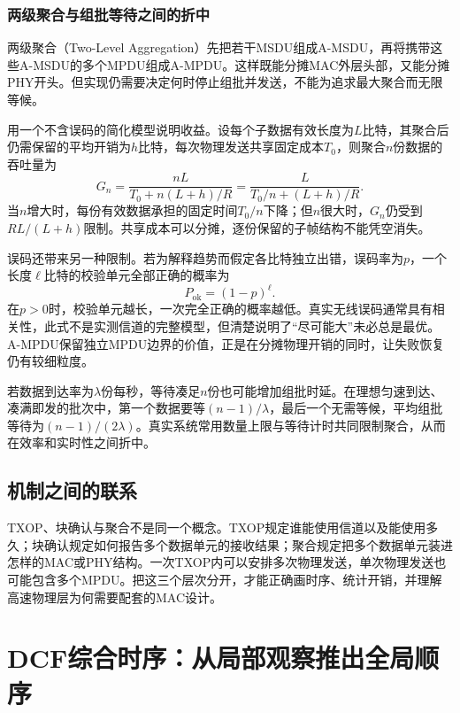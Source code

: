 \subsubsection{两级聚合与组批等待之间的折中}

两级聚合（Two-Level Aggregation）先把若干MSDU组成A-MSDU，再将携带这些A-MSDU的多个MPDU组成A-MPDU。这样既能分摊MAC外层头部，又能分摊PHY开头。但实现仍需要决定何时停止组批并发送，不能为追求最大聚合而无限等候。

用一个不含误码的简化模型说明收益。设每个子数据有效长度为$L$比特，其聚合后仍需保留的平均开销为$h$比特，每次物理发送共享固定成本$T_0$，则聚合$n$份数据的吞吐量为
\begin{equation}
G_n=\frac{nL}{T_0+n(L+h)/R}
=\frac{L}{T_0/n+(L+h)/R}.
\end{equation}
当$n$增大时，每份有效数据承担的固定时间$T_0/n$下降；但$n$很大时，$G_n$仍受到$R L/(L+h)$限制。共享成本可以分摊，逐份保留的子帧结构不能凭空消失。

误码还带来另一种限制。若为解释趋势而假定各比特独立出错，误码率为$p$，一个长度$\ell$比特的校验单元全部正确的概率为
\begin{equation}
P_{\mathrm{ok}}=(1-p)^\ell.
\end{equation}
在$p>0$时，校验单元越长，一次完全正确的概率越低。真实无线误码通常具有相关性，此式不是实测信道的完整模型，但清楚说明了“尽可能大”未必总是最优。A-MPDU保留独立MPDU边界的价值，正是在分摊物理开销的同时，让失败恢复仍有较细粒度。

若数据到达率为$\lambda$份每秒，等待凑足$n$份也可能增加组批时延。在理想匀速到达、凑满即发的批次中，第一个数据要等$(n-1)/\lambda$，最后一个无需等候，平均组批等待为$(n-1)/(2\lambda)$。真实系统常用数量上限与等待计时共同限制聚合，从而在效率和实时性之间折中。

\subsection{机制之间的联系}

TXOP、块确认与聚合不是同一个概念。TXOP规定谁能使用信道以及能使用多久；块确认规定如何报告多个数据单元的接收结果；聚合规定把多个数据单元装进怎样的MAC或PHY结构。一次TXOP内可以安排多次物理发送，单次物理发送也可能包含多个MPDU。把这三个层次分开，才能正确画时序、统计开销，并理解高速物理层为何需要配套的MAC设计。

\section{DCF综合时序：从局部观察推出全局顺序}
\label{chap:dcf-examples}

